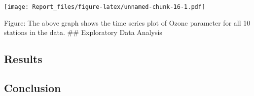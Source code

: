 \documentclass[
]{article}
\begin{document}
\texttt{[image: Report\_files/figure-latex/unnamed-chunk-16-1.pdf]}

\center Figure: The above graph shows the time series plot of Ozone
parameter for all 10 stations in the data. \#\# Exploratory Data
Analysis

\hypertarget{results}{%
\subsection{Results}\label{results}}

\hypertarget{conclusion}{%
\subsection{Conclusion}\label{conclusion}}
\end{document}
